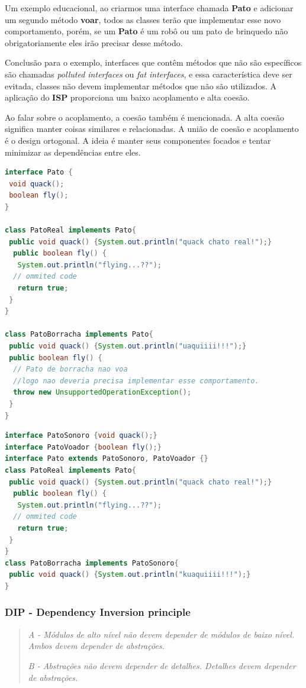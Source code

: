 \documentclass[12pt]{article}
\begin{document}
Um exemplo educacional, ao criarmos uma interface chamada \textbf{Pato} e adicionar um segundo método \textbf{voar}, todos as classes terão que implementar esse novo comportamento, porém, se um \textbf{Pato} é um robô ou um pato de brinquedo não obrigatoriamente eles irão precisar desse método.

Conclusão para o exemplo, interfaces que contêm métodos que não são específicos são chamadas \textit{polluted interfaces} ou \textit{fat interfaces}, e essa característica deve ser evitada, classes não devem implementar métodos que não são utilizados. A aplicação do \textbf{ISP} proporciona um baixo acoplamento e alta coesão.

Ao falar sobre o acoplamento, a coesão também é mencionada. A alta coesão significa manter coisas similares e relacionadas. A união de coesão e acoplamento é o design ortogonal. A ideia é manter seus componentes focados e tentar minimizar as dependências entre eles.

\begin{lstlisting}[caption=Exemplo de violação ao ISP,language=java]
interface Pato {
 void quack();
 boolean fly();
}

class PatoReal implements Pato{
 public void quack() {System.out.println("quack chato real!");}
  public boolean fly() {
   System.out.println("flying...??");
  // ommited code
   return true;
 }
}

class PatoBorracha implements Pato{
 public void quack() {System.out.println("uaquiiii!!!");}
 public boolean fly() {
  // Pato de borracha nao voa
  //logo nao deveria precisa implementar esse comportamento.
  throw new UnsupportedOperationException();
 }
}
\end{lstlisting}
\begin{lstlisting}[caption=Exemplo em conformidade ao ISP,language=java]
interface PatoSonoro {void quack();}
interface PatoVoador {boolean fly();}
interface Pato extends PatoSonoro, PatoVoador {}
class PatoReal implements Pato{
 public void quack() {System.out.println("quack chato real!");}
  public boolean fly() {
   System.out.println("flying...??");
  // ommited code
   return true;
 }
}
class PatoBorracha implements PatoSonoro{
 public void quack() {System.out.println("kuaquiiii!!!");}
}

\end{lstlisting}

\subsubsection{DIP - Dependency Inversion principle}
\begin{quote}
	\textit{A - Módulos de alto nível não devem depender de módulos de baixo nível. Ambos devem depender de abstrações.}

	\textit{B -  Abstrações não devem depender de detalhes. Detalhes devem depender de abstrações.}
\end{quote}
\end{document}
